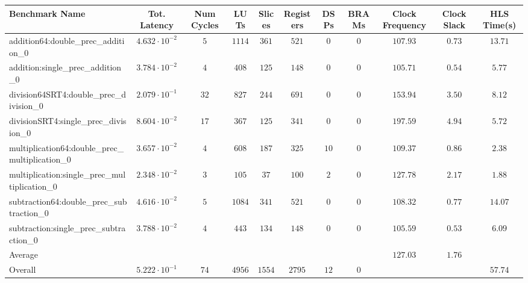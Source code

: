 \begin{tabular}{|l|c|c|c|c|c|c|c|c|c|c|}
\hline
Benchmark Name                                   & Tot. Latency            & Num Cycles & LUTs     & Slices   & Registers & DSPs   & BRAMs & Clock Frequency & Clock Slack & HLS Time(s) \\
\hline
addition64:double\_prec\_addition\_0             & $ 4.632 \cdot 10^{-2} $ & $ 5      $ & $ 1114 $ & $ 361  $ & $ 521   $ & $ 0  $ & $ 0 $ & $ 107.93      $ & $ 0.73    $ & $ 13.71   $ \\
addition:single\_prec\_addition\_0               & $ 3.784 \cdot 10^{-2} $ & $ 4      $ & $ 408  $ & $ 125  $ & $ 148   $ & $ 0  $ & $ 0 $ & $ 105.71      $ & $ 0.54    $ & $ 5.77    $ \\
division64SRT4:double\_prec\_division\_0         & $ 2.079 \cdot 10^{-1} $ & $ 32     $ & $ 827  $ & $ 244  $ & $ 691   $ & $ 0  $ & $ 0 $ & $ 153.94      $ & $ 3.50    $ & $ 8.12    $ \\
divisionSRT4:single\_prec\_division\_0           & $ 8.604 \cdot 10^{-2} $ & $ 17     $ & $ 367  $ & $ 125  $ & $ 341   $ & $ 0  $ & $ 0 $ & $ 197.59      $ & $ 4.94    $ & $ 5.72    $ \\
multiplication64:double\_prec\_multiplication\_0 & $ 3.657 \cdot 10^{-2} $ & $ 4      $ & $ 608  $ & $ 187  $ & $ 325   $ & $ 10 $ & $ 0 $ & $ 109.37      $ & $ 0.86    $ & $ 2.38    $ \\
multiplication:single\_prec\_multiplication\_0   & $ 2.348 \cdot 10^{-2} $ & $ 3      $ & $ 105  $ & $ 37   $ & $ 100   $ & $ 2  $ & $ 0 $ & $ 127.78      $ & $ 2.17    $ & $ 1.88    $ \\
subtraction64:double\_prec\_subtraction\_0       & $ 4.616 \cdot 10^{-2} $ & $ 5      $ & $ 1084 $ & $ 341  $ & $ 521   $ & $ 0  $ & $ 0 $ & $ 108.32      $ & $ 0.77    $ & $ 14.07   $ \\
subtraction:single\_prec\_subtraction\_0         & $ 3.788 \cdot 10^{-2} $ & $ 4      $ & $ 443  $ & $ 134  $ & $ 148   $ & $ 0  $ & $ 0 $ & $ 105.59      $ & $ 0.53    $ & $ 6.09    $ \\
\hline
Average                                          & $                     $ & $        $ & $      $ & $      $ & $       $ & $    $ & $   $ & $ 127.03      $ & $ 1.76    $ & $         $ \\
\hline
Overall                                          & $ 5.222 \cdot 10^{-1} $ & $ 74     $ & $ 4956 $ & $ 1554 $ & $ 2795  $ & $ 12 $ & $ 0 $ & $             $ & $         $ & $ 57.74   $ \\
\hline
\end{tabular}
